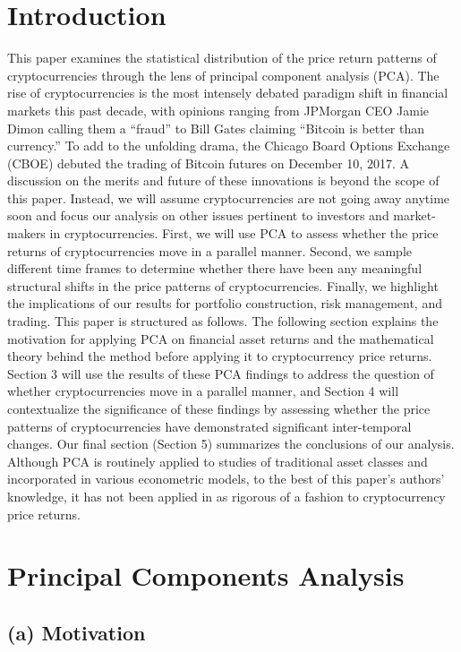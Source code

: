 \documentclass[12pt,twoside]{article}
\begin{document}
\newpage
\tableofcontents
\newpage
\setlength{\parindent}{0cm}
\section{Introduction}
This paper examines the statistical distribution of the price return patterns of cryptocurrencies through the lens of principal component analysis (PCA). The rise of cryptocurrencies is the most intensely debated paradigm shift in financial markets this past decade, with opinions ranging from JPMorgan CEO Jamie Dimon calling them a “fraud” to Bill Gates claiming “Bitcoin is better than currency.” To add to the unfolding drama, the Chicago Board Options Exchange (CBOE) debuted the trading of Bitcoin futures on December 10, 2017. A discussion on the merits and future of these innovations is beyond the scope of this paper.
\bigbreak
Instead, we will assume cryptocurrencies are not going away anytime soon and focus our analysis on other issues pertinent to investors and market-makers in cryptocurrencies. First, we will use PCA to assess whether the price returns of cryptocurrencies move in a parallel manner. Second, we sample different time frames to determine whether there have been any meaningful structural shifts in the price patterns of cryptocurrencies. Finally, we highlight the implications of our results for portfolio construction, risk management, and trading.
\bigbreak
This paper is structured as follows. The following section explains the motivation for applying PCA on financial asset returns and the mathematical theory behind the method before applying it to cryptocurrency price returns. Section 3 will use the results of these PCA findings to address the question of whether cryptocurrencies move in a parallel manner, and Section 4 will contextualize the significance of these findings by assessing whether the price patterns of cryptocurrencies have demonstrated significant inter-temporal changes. Our final section (Section 5) summarizes the conclusions of our analysis. Although PCA is routinely applied to studies of traditional asset classes and incorporated in various econometric models, to the best of this paper’s authors’ knowledge, it has not been applied in as rigorous of a fashion to cryptocurrency price returns.


\section{Principal Components Analysis}
\subsection{(a) Motivation}
\end{document}
